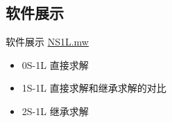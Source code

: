 \subsection{软件展示}
\begin{frame}{软件展示}
\href{run:../LypReportProgram/NS1L.mw}{NS1L.mw}
\begin{itemize}
\item 0S-1L 直接求解 
\item 1S-1L 直接求解和继承求解的对比
\item 2S-1L 继承求解
\end{itemize}
\end{frame}